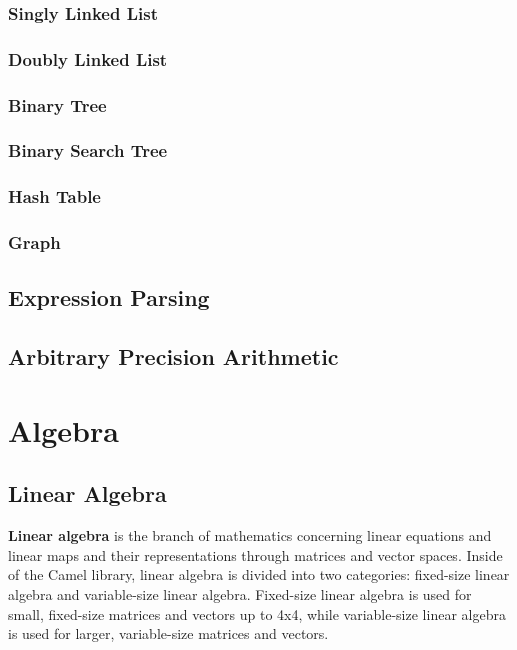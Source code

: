 \documentclass[a4paper,oneside,8pt]{extarticle}
\theoremstyle{definition}
\begin{document}
\subsubsection{Singly Linked List}

\subsubsection{Doubly Linked List}

\subsubsection{Binary Tree}

\subsubsection{Binary Search Tree}

\subsubsection{Hash Table}

\subsubsection{Graph}

\subsection{Expression Parsing}

\subsection{Arbitrary Precision Arithmetic}

\section{Algebra} \label{sec:algebra}

\subsection{Linear Algebra}

\textbf{Linear algebra} is the branch of mathematics concerning linear equations and linear maps and their representations through matrices and vector spaces. Inside of the Camel library, linear algebra is divided into two categories: fixed-size linear algebra and variable-size linear algebra. Fixed-size linear algebra is used for small, fixed-size matrices and vectors up to 4x4, while variable-size linear algebra is used for larger, variable-size matrices and vectors.
\end{document}
